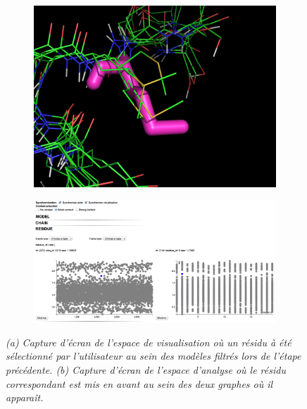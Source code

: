 \begin{figure}[!htb]
\captionsetup[subfigure]{labelformat=empty}
\centering
  \begin{subfigure}{0.5\textwidth}
  \centering
  {\includegraphics[width=\linewidth]{./figures/ch5/5_sub_selection_pymol3}}
    \caption{}
  \label{Fig:5_sub_selection_pymol}
  \end{subfigure}
  \vfill
  \begin{subfigure}{\textwidth}
  \centering
  {\includegraphics[width=0.9\linewidth,frame]{./figures/ch5/5_sub_selection_edit}}
    \caption{}
  \label{Fig:5_sub_selection}
  \end{subfigure}
  \caption[Troisième étape d'utilisation de notre plateforme]{\it (a) Capture d'écran de l'espace de visualisation où un résidu à été sélectionné par l'utilisateur au sein des modèles filtrés lors de l'étape précédente.
  (b) Capture d'écran de l'espace d'analyse où le résidu correspondant est mis en avant au sein des deux graphes où il apparaît.}
\end{figure}

